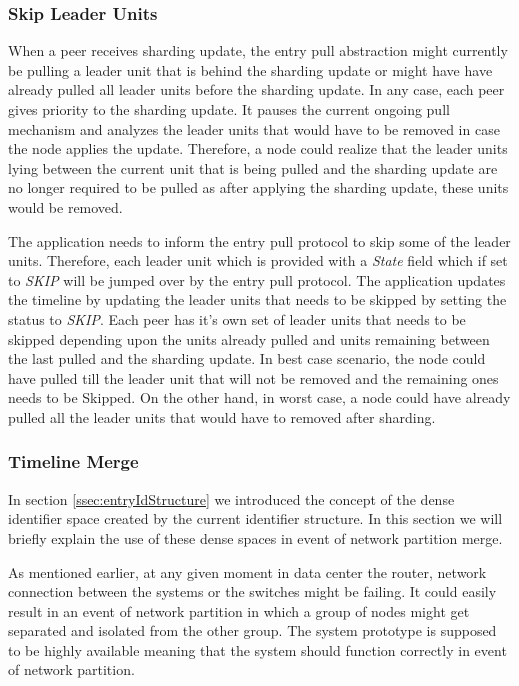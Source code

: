 \documentclass[12pt,a4paper,twoside,openright]{book}
\begin{document}
\subsubsection{Skip Leader Units}

When a peer receives sharding update, the entry pull abstraction might currently be pulling a leader unit that is behind the sharding update or might have have already pulled all leader units before the sharding update. In any case, each peer gives priority to the sharding update. It pauses the current ongoing pull mechanism and analyzes the leader units that would have to be removed in case the node applies the update. Therefore, a node could realize that the leader units lying between the current unit that is being pulled and the sharding update are no longer required to be pulled as after applying the sharding update, these units would be removed.
\par The application needs to inform the entry pull protocol to skip some of the leader units. Therefore, each leader unit which is provided with a \textit{State} field which if set to \textit{SKIP} will be jumped over by the entry pull protocol. The application updates the timeline by updating the leader units that needs to be skipped by setting the status to \textit{SKIP}. Each peer has it's own set of leader units that needs to be skipped depending upon the units already pulled and units remaining between the last pulled and the sharding update. In best case scenario, the node could have pulled till the leader unit that will not be removed and the remaining ones needs to be Skipped. On the other hand, in worst case, a node could have already pulled all the leader units that would have to removed after sharding.

\subsubsection{Timeline Merge}
In section \ref{ssec:entryIdStructure} we introduced the concept of the dense identifier space created by the current identifier structure. In this section we will briefly explain the use of these dense spaces in event of network partition merge. 


\par As mentioned earlier, at any given moment in data center the router, network connection between the systems or the switches might be failing. It could easily result in an event of network partition in which a group of nodes might get separated and isolated from the other group. The system prototype is supposed to be highly available meaning that the system should function correctly in event of network partition. 
\end{document}

